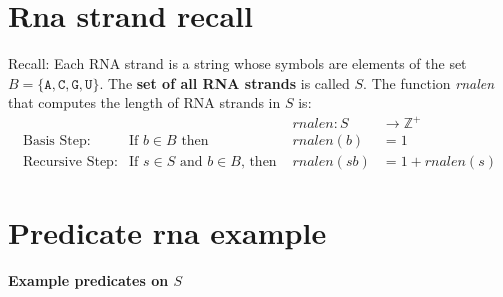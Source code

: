 \documentclass[12pt, oneside]{article}
\newcommand{\A}[0]{\texttt{A}}
\newcommand{\C}[0]{\texttt{C}}
\newcommand{\G}[0]{\texttt{G}}
\newcommand{\U}[0]{\texttt{U}}
\begin{document}
\vfill \vfill
\section*{Rna strand recall}


Recall: Each RNA strand is a string whose symbols are elements of the set $B  = \{\A, \C, \G, \U \}$.
The {\bf set of all RNA strands} is called $S$.
The function \textit{rnalen} that computes the length of RNA strands in $S$ is:
\[
\begin{array}{llll}
& & \textit{rnalen} : S & \to \mathbb{Z}^+ \\
\textrm{Basis Step:} & \textrm{If } b \in B\textrm{ then } & \textit{rnalen}(b) & = 1 \\
\textrm{Recursive Step:} & \textrm{If } s \in S\textrm{ and }b \in B\textrm{, then  } & \textit{rnalen}(sb) & = 1 + \textit{rnalen}(s)
\end{array}
\] \vfill
\section*{Predicate rna example}


{\bf Example predicates on $S$}

\vspace{-20pt}
\end{document}
